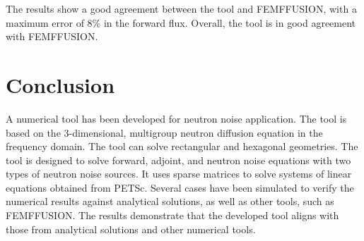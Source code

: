 The results show a good agreement between the tool and FEMFFUSION, with a maximum error of 8\% in the forward flux. Overall, the tool is in good agreement with FEMFFUSION.

\section{Conclusion}

A numerical tool has been developed for neutron noise application. The tool is based on the 3-dimensional, multigroup neutron diffusion equation in the frequency domain. The tool can solve rectangular and hexagonal geometries. The tool is designed to solve forward, adjoint, and neutron noise equations with two types of neutron noise sources. It uses sparse matrices to solve systems of linear equations obtained from PETSc. Several cases have been simulated to verify the numerical results against analytical solutions, as well as other tools, such as FEMFFUSION. The results demonstrate that the developed tool aligns with those from analytical solutions and other numerical tools. 
